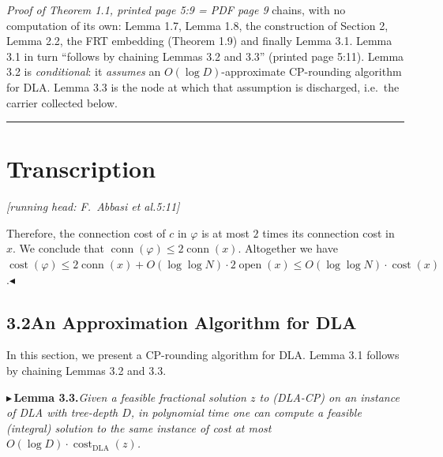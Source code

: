 \documentclass[11pt]{article}
\newcommand{\cost}{\operatorname{cost}}
\newcommand{\costDLA}{\operatorname{cost}_{\mathrm{DLA}}}
\newcommand{\conn}{\operatorname{conn}}
\newcommand{\openop}{\operatorname{open}}
\newcommand{\pitem}[2]{\par\medskip\noindent$\blacktriangleright$\,\textbf{#1}\;\textit{#2}\par\medskip}
\begin{document}
\noindent\emph{Proof of Theorem 1.1, printed page 5:9 = PDF page 9} chains, with no
computation of its own: Lemma 1.7, Lemma 1.8, the construction of Section 2, Lemma 2.2,
the FRT embedding (Theorem 1.9) and finally Lemma 3.1. Lemma 3.1 in turn ``follows by
chaining Lemmas 3.2 and 3.3'' (printed page 5:11). Lemma 3.2 is \emph{conditional}: it
\emph{assumes} an $O(\log D)$-approximate CP-rounding algorithm for DLA. Lemma 3.3 is the
node at which that assumption is discharged, i.e.\ the carrier collected below.

\noindent\rule{\textwidth}{0.6pt}

\section*{Transcription}

\noindent\textit{\small [running head: F.~Abbasi et al.\hfill 5:11]}

\medskip
Therefore, the connection cost of $c$ in $\varphi$ is at most $2$ times its connection cost in $x$. We
conclude that $\conn(\varphi)\le 2\conn(x)$. Altogether we have $\cost(\varphi)\le 2\conn(x)+O(\log\log N)\cdot
2\openop(x)\le O(\log\log N)\cdot\cost(x)$.\hfill$\blacktriangleleft$

\subsection*{3.2\quad An Approximation Algorithm for DLA}

In this section, we present a CP-rounding algorithm for DLA. Lemma 3.1 follows by chaining
Lemmas 3.2 and 3.3.

\pitem{Lemma 3.3.}{Given a feasible fractional solution $z$ to (DLA-CP) on an instance of DLA
with tree-depth $D$, in polynomial time one can compute a feasible (integral) solution to the
same instance of cost at most $O(\log D)\cdot\costDLA(z)$.}
\end{document}
